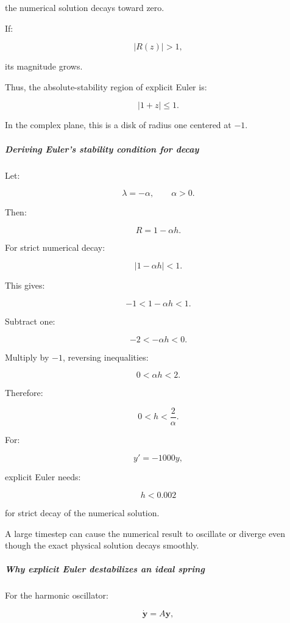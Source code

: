 the numerical solution decays toward zero.

If:

\[
|R(z)|>1,
\]

its magnitude grows.

Thus, the absolute-stability region of explicit Euler is:

\[
\boxed{|1+z|\le1}.
\]

In the complex plane, this is a disk of radius one centered at \(-1\).

\subparagraph{Deriving Euler's stability condition for decay}\label{02-foundations-ii-ch025-deriving-eulers-stability-condition-for-decay}

\hypertarget{02-foundations-ii-ch025-deriving-eulers-stability-condition-for-decay}{}

Let:

\[
\lambda=-\alpha,\qquad\alpha>0.
\]

Then:

\[
R=1-\alpha h.
\]

For strict numerical decay:

\[
|1-\alpha h|<1.
\]

This gives:

\[
-1<1-\alpha h<1.
\]

Subtract one:

\[
-2<-\alpha h<0.
\]

Multiply by \(-1\), reversing inequalities:

\[
0<\alpha h<2.
\]

Therefore:

\[
\boxed{ 0<h<\frac2\alpha }.
\]

For:

\[
y'=-1000y,
\]

explicit Euler needs:

\[
\boxed{h<0.002}
\]

for strict decay of the numerical solution.

A large timestep can cause the numerical result to oscillate or diverge even though the exact physical solution decays smoothly.

\subparagraph{Why explicit Euler destabilizes an ideal spring}\label{02-foundations-ii-ch025-why-explicit-euler-destabilizes-an-ideal-spring}

\hypertarget{02-foundations-ii-ch025-why-explicit-euler-destabilizes-an-ideal-spring}{}

For the harmonic oscillator:

\[
\dot{\mathbf y}=A\mathbf y,
\]

